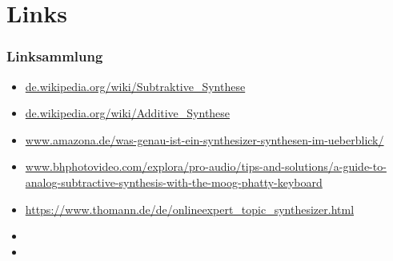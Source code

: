 \documentclass[11pt,ngerman]{beamer}
\begin{document}
 
\section{Links} 
 
\begin{frame}[allowframebreaks]
\frametitle{Linksammlung}


\begin{itemize}
\item \url{de.wikipedia.org/wiki/Subtraktive_Synthese}
\item \url{de.wikipedia.org/wiki/Additive_Synthese}
\item \url{www.amazona.de/was-genau-ist-ein-synthesizer-synthesen-im-ueberblick/}
\item \url{www.bhphotovideo.com/explora/pro-audio/tips-and-solutions/a-guide-to-analog-subtractive-synthesis-with-the-moog-phatty-keyboard}
\item \url{https://www.thomann.de/de/onlineexpert_topic_synthesizer.html}
\item 
\item 
\end{itemize}
\end{frame} 
 
 
 
\end{document}
